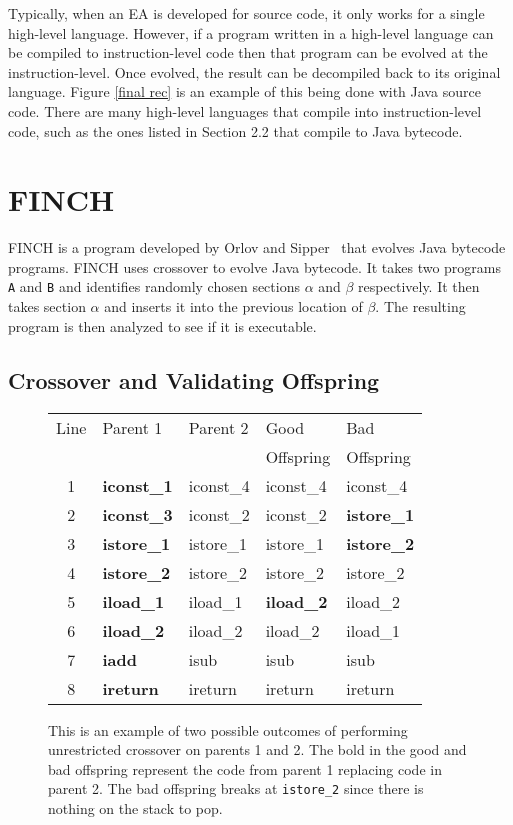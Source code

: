 \documentclass{sig-alternate}
\begin{document}
Typically, when an EA is developed for source code, it only works for a single high-level language. However, if a program written in a high-level language can be compiled to instruction-level code then that program can be evolved at the instruction-level. Once evolved, the result can be decompiled back to its original language. Figure \ref{final rec} is an example of this being done with Java source code. There are many high-level languages that compile into instruction-level code, such as the ones listed in Section 2.2 that compile to Java bytecode.


\section{FINCH}
FINCH is a program developed by Orlov and Sipper~\cite{FINCH2:2009,FINCH:2011} that evolves Java bytecode programs. FINCH uses crossover to evolve Java bytecode. It takes two programs \texttt{A} and \texttt{B} and identifies randomly chosen sections $\alpha$ and $\beta$ respectively. It then takes section $\alpha$ and inserts it into the previous location of $\beta$. The resulting program is then analyzed to see if it is executable.

\subsection{Crossover and Validating Offspring}

\begin{figure}
\begin{tabular}{|c|l|l|l|l|}

\hline
Line&Parent 1&Parent 2&Good&Bad\\  
 &         &         &Offspring&Offspring\\ \hline
1&\textbf{iconst\_1}&iconst\_4&iconst\_4&iconst\_4\\
2&\textbf{iconst\_3}&iconst\_2&iconst\_2&\textbf{istore\_1}\\
3&\textbf{istore\_1}&istore\_1&istore\_1&\textbf{istore\_2}\\
4&\textbf{istore\_2}&istore\_2&istore\_2&istore\_2\\
5&\textbf{iload\_1}&iload\_1&\textbf{iload\_2}&iload\_2\\
6&\textbf{iload\_2}&iload\_2&iload\_2&iload\_1\\
7&\textbf{iadd}&isub&isub&isub\\
8&\textbf{ireturn}&ireturn&ireturn&ireturn\\
\hline
\end{tabular}
\caption{This is an example of two possible outcomes of performing unrestricted crossover on parents 1 and 2. The bold in the good and bad offspring represent the code from parent 1 replacing code in parent 2. The bad offspring breaks at \texttt{istore\_2} since there is nothing on the stack to pop.}
\label{crossover}
  
\end{figure}
\end{document}
